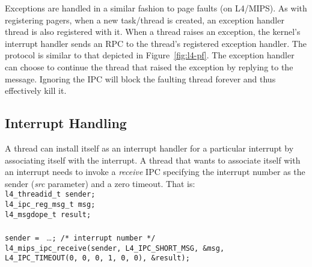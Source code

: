 
Exceptions are handled in a similar fashion to page faults (on
L4/MIPS). As with registering pagers, when a new task/thread is
created, an exception handler thread is also registered with it. When
a thread raises an exception, the kernel's interrupt handler sends an
RPC to the thread's registered exception handler. The protocol is
similar to that depicted in Figure~\ref{fig:l4-pf}. The exception
handler can choose to continue the thread that raised the exception by
replying to the message. Ignoring the IPC will block the faulting
thread forever and thus effectively kill it.


\subsection{Interrupt Handling}


\label{sec:interrupts}

A thread can install itself as an interrupt handler for a particular
interrupt by associating itself with the interrupt. A thread that
wants to associate itself with an interrupt needs to invoke a
\emph{receive} IPC specifying the interrupt number as the sender
(\emph{src} parameter) and a zero timeout. That is: \\ 

\hspace*{20pt} {\footnotesize\verb+l4_threadid_t sender;+} \\
\hspace*{20pt} {\footnotesize\verb+l4_ipc_reg_msg_t msg;+} \\
\hspace*{20pt} {\footnotesize\verb+l4_msgdope_t result;+}\\ \\
\hspace*{20pt} {\footnotesize\verb+sender = +} \ldots {\footnotesize\verb+; /* interrupt number */+}\\
\hspace*{20pt} {\footnotesize\verb+l4_mips_ipc_receive(sender, L4_IPC_SHORT_MSG, &msg,+}\\
\hspace*{126pt} {\footnotesize\verb+L4_IPC_TIMEOUT(0, 0, 0, 1, 0, 0), &result);+}\\

